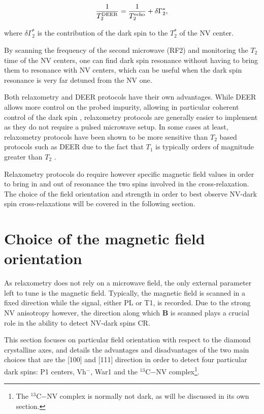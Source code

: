 \documentclass[a4paper, 11pt]{book}
\begin{document}
\begin{equation}
\frac{1}{T_2^{\rm DEER}}=\frac{1}{T_2^{\rm echo}} + \delta \Gamma_2^*,
\end{equation}

where $\delta \Gamma_2^*$ is the contribution of the dark spin to the $T_2^*$ of the NV center.

By scanning the frequency of the second microwave (RF2) and monitoring the $T_2$ time of the NV centers, one can find dark spin resonance without having to bring them to resonance with NV centers, which can be useful when the dark spin resonance is very far detuned from the NV one.

Both relaxometry and DEER protocols have their own advantages. While DEER allows more control on the probed impurity, allowing in particular coherent control of the dark spin \citep{sushkov2014magnetic}, relaxometry protocols are generally easier to implement as they do not require a pulsed microwave setup. In some cases at least, relaxometry protocols have been shown to be more sensitive than $T_2$ based protocols such as DEER due to the fact that $T_1$ is typically orders of magnitude greater than $T_2$ \citep{steinert2013magnetic}.

Relaxometry protocols do require however specific magnetic field values in order to bring in and out of resonance the two spins involved in the cross-relaxation. The choice of the field orientation and strength in order to best observe NV-dark spin cross-relaxations will be covered in the following section.

\section{Choice of the magnetic field orientation}

As relaxometry does not rely on a microwave field, the only external parameter left to tune is the magnetic field. Typically, the magnetic field is scanned in a fixed direction while the signal, either PL or T1, is recorded. Due to the strong NV anisotropy however, the direction along which $\mathbf{B}$ is scanned plays a crucial role in the ability to detect NV-dark spins CR.

This section focuses on particular field orientation with respect to the diamond crystalline axes, and details the advantages and disadvantages of the two main choices that are the [100] and [111] direction in order to detect four particular dark spins: P1 centers, Vh$^-$, War1 and the $^{13}$C$-$NV complex\footnote{The $^{13}$C$-$NV complex is normally not dark, as will be discussed in its own section.}.
\end{document}
